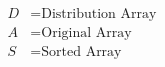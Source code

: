 \documentclass[preview]{standalone}
\begin{document}
\begin{center}
\begin{align*}D & = \text{Distribution Array} \\A & = \text{Original Array} \\S & = \text{Sorted Array} \\\end{align*}
\end{center}
\end{document}
